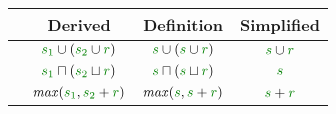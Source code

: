 \begin{table}
\begin{center}
\begin{tabular}{ | l | c | c | c |}
\hline
& \textbf{\footnotesize Derived \hspace{1em}} & \textbf{\footnotesize Definition\hspace{1em}} & \textbf{\footnotesize Simplified\hspace{1em}} \\ \hline
\hspace{-1em}{\footnotesize Implicit parameters} & $\cclrd{s_1} \cup (\cclrd{s_2} \cup \cclrd{r})$ & $\cclrd{s} \cup (\cclrd{s} \cup \cclrd{r})$ & $\cclrd{s} \cup \cclrd{r}$ \\ \hline
\hspace{-1em}{\footnotesize Liveness} & $\cclrd{s_1} \sqcap (\cclrd{s_2} \sqcup \cclrd{r})$ & $\cclrd{s} \sqcap (\cclrd{s} \sqcup \cclrd{r})$ & $\cclrd{s}$ \\ \hline
\hspace{-1em}{\footnotesize Dataflow} & $\mathit{max}(\cclrd{s_1}, \cclrd{s_2} + \cclrd{r})$ & $\mathit{max}(\cclrd{s}, \cclrd{s} + \cclrd{r})$ & $\cclrd{s} + \cclrd{r}$ \\ \hline
\end{tabular}
\end{center}

\vspace{-0.5em}
\label{tab:flat-simplelet}
\end{table}

